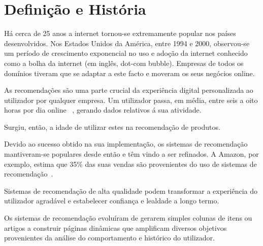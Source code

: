 \section{Definição e História}

\par Há cerca de 25 anos a internet tornou-se extremamente popular nos países desenvolvidos. Nos Estados Unidos da América, entre 1994 e 2000, observou-se um período de crescimento exponencial no uso e adoção da internet conhecido como a bolha da internet (em inglês, dot-com bubble). Empresas de todos os domínios tiveram que se adaptar a este facto e moveram os seus negócios online. 

\par As recomendações são uma parte crucial da experiência digital personalizada ao utilizador por qualquer empresa. Um utilizador passa, em média, entre seis a oito horas por dia online ~\cite{ref_history1}, gerando dados relativos á sua atividade. 

\par Surgiu, então, a idade de utilizar estes na recomendação de produtos. 

\par Devido ao sucesso obtido na sua implementação, os sistemas de recomendação mantiveram-se populares desde então e têm vindo a ser refinados. A Amazon, por exemplo, estima que 35\% das suas vendas são provenientes do uso de sistemas de recomendação~\cite{ref_history2}. 

\par Sistemas de recomendação de alta qualidade podem transformar a experiência do utilizador agradável e estabelecer confiança e lealdade a longo termo. 

\par Os sistemas de recomendação evoluíram de gerarem simples colunas de itens ou artigos a construir páginas dinâmicas que amplificam diversos objetivos provenientes da análise do comportamento e histórico do utilizador. 
